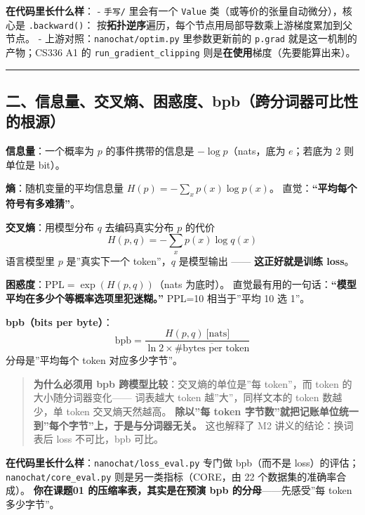 \documentclass[
  chinese,
  11pt,
]{ctexart}
\begin{document}
\textbf{在代码里长什么样}： - \texttt{手写/} 里会有一个 \texttt{Value} 类（或等价的张量自动微分），核心是 \texttt{.backward()}： 按\textbf{拓扑逆序}遍历，每个节点用局部导数乘上游梯度累加到父节点。 - 上游对照：\texttt{nanochat/optim.py} 里参数更新前的 \texttt{p.grad} 就是这一机制的产物；CS336 A1 的 \texttt{run\_gradient\_clipping} 则是\textbf{在使用}梯度（先要能算出来）。

\begin{center}\rule{0.5\linewidth}{0.5pt}\end{center}

\subsection{\texorpdfstring{二、信息量、交叉熵、困惑度、bpb（\textbf{跨分词器可比性}的根源）}{二、信息量、交叉熵、困惑度、bpb（跨分词器可比性的根源）}}\label{ux4e8cux4fe1ux606fux91cfux4ea4ux53c9ux71b5ux56f0ux60d1ux5ea6bpbux8de8ux5206ux8bcdux5668ux53efux6bd4ux6027ux7684ux6839ux6e90}

\textbf{信息量}：一个概率为 \(p\) 的事件携带的信息是 \(-\log p\)（nats，底为 \(e\)；若底为 2 则单位是 bit）。

\textbf{熵}：随机变量的平均信息量 \(H(p) = -\sum_x p(x)\log p(x)\)。 直觉：\textbf{``平均每个符号有多难猜''}。

\textbf{交叉熵}：用模型分布 \(q\) 去编码真实分布 \(p\) 的代价 \[H(p,q) = -\sum_x p(x)\log q(x)\] 语言模型里 \(p\) 是''真实下一个 token''，\(q\) 是模型输出 ------ \textbf{这正好就是训练 loss}。

\textbf{困惑度}：\(\mathrm{PPL} = \exp(H(p,q))\)（nats 为底时）。 直觉最有用的一句话：\textbf{``模型平均在多少个等概率选项里犯迷糊。''} PPL=10 相当于''平均 10 选 1''。

\textbf{bpb（bits per byte）}： \[\mathrm{bpb} = \frac{H(p,q)\ \text{[nats]}}{\ln 2 \times \overline{\#\text{bytes per token}}}\] 分母是''平均每个 token 对应多少字节''。

\begin{quote}
\textbf{为什么必须用 bpb 跨模型比较}：交叉熵的单位是''每 token''，而 token 的大小随分词器变化------ 词表越大 token 越''大''，同样文本的 token 数越少，单 token 交叉熵天然越高。 \textbf{除以''每 token 字节数''就把记账单位统一到''每个字节''上，于是与分词器无关。} 这也解释了 M2 讲义的结论：换词表后 loss 不可比，bpb 可比。
\end{quote}

\textbf{在代码里长什么样}：\texttt{nanochat/loss\_eval.py} 专门做 bpb（而不是 loss）的评估； \texttt{nanochat/core\_eval.py} 则是另一类指标（CORE，由 22 个数据集的准确率合成）。 \textbf{你在课题01 的压缩率表，其实是在预演 bpb 的分母}------先感受''每 token 多少字节''。
\end{document}
